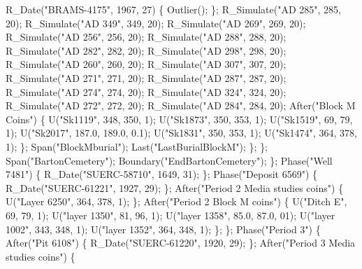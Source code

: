 \documentclass[
]{agujournal2019}
\newenvironment{Shaded}{\begin{snugshade}}{\end{snugshade}}
\newcommand{\NormalTok}[1]{\textcolor[rgb]{0.00,0.23,0.31}{#1}}
\begin{document}
\begin{tcolorbox}
\begin{Shaded}
\begin{Highlighting}[]
\NormalTok{         R\_Date("BRAMS{-}4175", 1967, 27)}
\NormalTok{         \{}
\NormalTok{          Outlier();}
\NormalTok{         \};}
\NormalTok{         R\_Simulate("AD 285", 285, 20);}
\NormalTok{         R\_Simulate("AD 349", 349, 20);}
\NormalTok{         R\_Simulate("AD 269", 269, 20);}
\NormalTok{         R\_Simulate("AD 256", 256, 20);}
\NormalTok{         R\_Simulate("AD 288", 288, 20);}
\NormalTok{         R\_Simulate("AD 282", 282, 20);}
\NormalTok{         R\_Simulate("AD 298", 298, 20);}
\NormalTok{         R\_Simulate("AD 260", 260, 20);}
\NormalTok{         R\_Simulate("AD 307", 307, 20);}
\NormalTok{         R\_Simulate("AD 271", 271, 20);}
\NormalTok{         R\_Simulate("AD 287", 287, 20);}
\NormalTok{         R\_Simulate("AD 274", 274, 20);}
\NormalTok{         R\_Simulate("AD 324", 324, 20);}
\NormalTok{         R\_Simulate("AD 272", 272, 20);}
\NormalTok{         R\_Simulate("AD 284", 284, 20);}
\NormalTok{         After("Block M Coins")}
\NormalTok{         \{}
\NormalTok{          U("Sk1119", 348, 350, 1);}
\NormalTok{          U("Sk1873", 350, 353, 1);}
\NormalTok{          U("Sk1519", 69, 79, 1);}
\NormalTok{          U("Sk2017", 187.0, 189.0, 0.1);}
\NormalTok{          U("Sk1831", 350, 353, 1);}
\NormalTok{          U("Sk1474", 364, 378, 1);}
\NormalTok{         \};}
\NormalTok{         Span("BlockMburial");}
\NormalTok{         Last("LastBurialBlockM");}
\NormalTok{        \};}
\NormalTok{       \};}
\NormalTok{       Span("BartonCemetery");}
\NormalTok{       Boundary("EndBartonCemetery");}
\NormalTok{      \};}
\NormalTok{      Phase("Well 7481")}
\NormalTok{      \{}
\NormalTok{       R\_Date("SUERC{-}58710", 1649, 31);}
\NormalTok{      \};}
\NormalTok{      Phase("Deposit 6569")}
\NormalTok{      \{}
\NormalTok{       R\_Date("SUERC{-}61221", 1927, 29);}
\NormalTok{      \};}
\NormalTok{      After("Period 2 Media studies coins")}
\NormalTok{      \{}
\NormalTok{       U("Layer 6250", 364, 378, 1);}
\NormalTok{      \};}
\NormalTok{      After("Period 2 Block M coins")}
\NormalTok{      \{}
\NormalTok{       U("Ditch E", 69, 79, 1);}
\NormalTok{       U("layer 1350", 81, 96, 1);}
\NormalTok{       U("layer 1358", 85.0, 87.0, 01);}
\NormalTok{       U("layer 1002", 343, 348, 1);}
\NormalTok{       U("layer 1352", 364, 348, 1);}
\NormalTok{      \};}
\NormalTok{     \};}
\NormalTok{     Phase("Period 3")}
\NormalTok{     \{}
\NormalTok{      After("Pit 6108")}
\NormalTok{      \{}
\NormalTok{       R\_Date("SUERC{-}61220", 1920, 29);}
\NormalTok{      \};}
\NormalTok{      After("Period 3 Media studies coins")}
\NormalTok{      \{}

\end{Highlighting}
\end{Shaded}
\end{tcolorbox}
\end{document}
